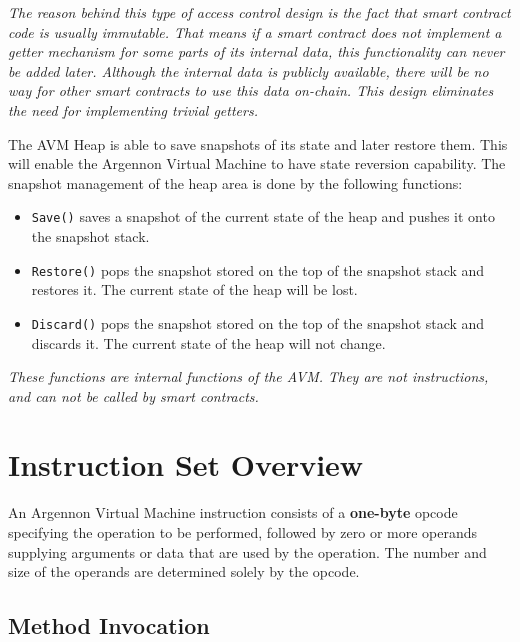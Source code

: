 \documentclass[11pt, a4paper]{report}
\newcommand{\note}[1] {
    \begin{tcolorbox}[colframe=white,colback=white]
        \emph{#1}
    \end{tcolorbox}
}
\begin{document}
    \note{The reason behind this type of access control design is the fact that smart contract code is usually
    immutable. That means if a smart contract does not implement a getter mechanism for some parts of its internal
    data, this functionality can never be added later. Although the internal data is publicly available, there will
    be no way for other smart contracts to use this data on-chain. This design eliminates the need for implementing
    \emph{trivial} getters.}

    The AVM Heap is able to save snapshots of its state and later restore them. This will enable the Argennon
    Virtual Machine to have state reversion capability. The snapshot management of the heap area is done by
    the following functions:
    \begin{itemize}
        \item \texttt{Save()} saves a snapshot of the current state of the heap and pushes it onto the
        snapshot stack.
        \item \texttt{Restore()} pops the snapshot stored on the top of the snapshot stack and restores it. The
        current state of the heap will be lost.
        \item \texttt{Discard()} pops the snapshot stored on the top of the snapshot stack and discards it. The current
        state of the heap will not change.
    \end{itemize}

    \note{These functions are internal functions of the AVM. They are not instructions, and can not be called by smart
    contracts.}

    \section{Instruction Set Overview}\label{sec:instruction-set-overview}

    An Argennon Virtual Machine instruction consists of a \textbf{one-byte} opcode specifying the operation to be
    performed, followed by zero or more operands supplying arguments or data that are used by the operation.
    The number and size of the operands are determined solely by the opcode.

    \subsection{Method Invocation}\label{subsec:method-invocation}
\end{document}
